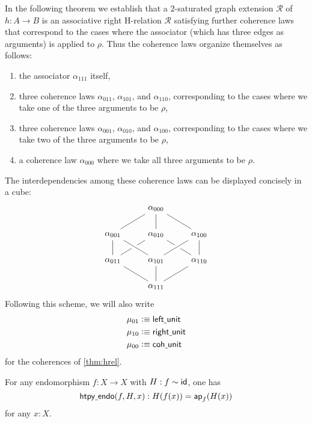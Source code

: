 In the following theorem we establish that a $2$-saturated graph extension $\mathcal{R}$ of $h:A\to B$ is an associative right H-relation $\mathcal{R}$ satisfying further coherence laws that correspond to the cases where the associator (which has three edges as arguments) is applied to $\rho$. Thus the coherence laws organize themselves as follows:
\begin{enumerate}
\item the associator $\alpha_{111}$ itself,
\item three coherence laws $\alpha_{011}$, $\alpha_{101}$, and $\alpha_{110}$, corresponding to the cases where we take one of the three arguments to be $\rho$,
\item three coherence laws $\alpha_{001}$, $\alpha_{010}$, and $\alpha_{100}$, corresponding to the cases where we take two of the three arguments to be $\rho$,
\item a coherence law $\alpha_{000}$ where we take all three arguments to be $\rho$.
\end{enumerate}
The interdependencies among these coherence laws can be displayed concisely in a cube:
\begin{equation*}
\begin{tikzcd}
& \alpha_{000} \arrow[dl,-] \arrow[d,-] \arrow[dr,-] \\
\alpha_{001} \arrow[d,-] & \alpha_{010} \arrow[dl,-] \arrow[dr,-] & \alpha_{100} \arrow[d,-] \\
\alpha_{011} \arrow[dr,-] & \alpha_{101} \arrow[d,-] \arrow[from=ul,crossing over,-] \arrow[from=ur,crossing over,-] & \alpha_{110} \arrow[dl,-] \\
& \alpha_{111}
\end{tikzcd}
\end{equation*}
Following this scheme, we will also write
\begin{align*}
\mu_{01} & \vcentcolon\equiv \mathsf{left\underline{\ }{}unit} \\
\mu_{10} & \vcentcolon\equiv \mathsf{right\underline{\ }{}unit} \\
\mu_{00} & \vcentcolon\equiv \mathsf{coh\underline{\ }{}unit}
\end{align*}
for the coherences of \autoref{thm:hrel}.

\begin{defn}
For any endomorphism $f:X\to X$ with $H:f\sim \mathsf{id}_{}$, one has
\begin{equation*}
\mathsf{htpy\underline{\ }{}endo}(f,H,x):H(f(x))=\mathsf{ap}_f(H(x))
\end{equation*}
for any $x:X$.
\end{defn}

